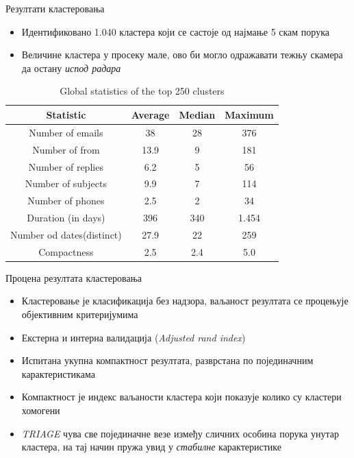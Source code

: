 \documentclass[compress, containsverbatim,mathserif, xcolor=dvipsnames, unicode]{beamer}
\begin{document}
\begin{frame}{Резултати кластеровања}
\begin{itemize}
	\item Идентификовано 1.040 кластера који се састоје од најмање 5 скам порука
	\item Величине кластера у просеку мале, ово би могло одражавати тежњу скамера да остану \emph{испод радара}
\end{itemize}
\begin{table}[h!]
\begin{center}
\caption{Global statistics of the top 250 clusters}
\begin{tabular}{|c|c|c|c|} \hline
\textbf{Statistic} & \textbf{Average} & \textbf{Median} & \textbf{Maximum} \\ \hline
Number of emails & 38 & 28 & 376\\ \hline
Number of from & 13.9 & 9 & 181\\ \hline
Number of replies & 6.2 & 5 & 56\\ \hline
Number of subjects & 9.9 & 7 & 114\\ \hline
Number of phones & 2.5 & 2 & 34\\ \hline
Duration (in days) & 396 & 340 & 1.454\\ \hline
Number od dates(distinct) & 27.9 & 22 & 259\\ \hline
Compactness & 2.5 & 2.4 & 5.0\\ \hline
\end{tabular}
\label{tab:tabela4}
\end{center}
\end{table}		
\end{frame}

\begin{frame}{Процена резултата кластеровања}
\begin{itemize}
	\item Кластеровање је класификација без надзора, ваљаност резултата се процењује објективним критеријумима
	\item Екстерна и интерна валидација (\emph{Adjusted rand index})
	\item Испитана укупна компактност резултата, разврстана по појединачним карактеристикама
	\item Компактност је индекс ваљаности кластера који показује колико су кластери хомогени
	\item \emph{TRIAGE} чува све појединачне везе између сличних особина порука унутар кластера, на тај начин пружа увид у \emph{стабилне} карактеристике 
\end{itemize}
\end{frame}
\end{document}
